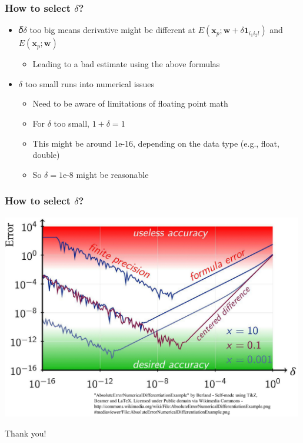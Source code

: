 \documentclass[12pt,notes,mathserif]{beamer}
\newcommand{\chuhao}{\fontsize{44.9pt}{\baselineskip}\selectfont}
\begin{document}
\begin{frame}[c]
\frametitle{How to select $\delta$?}
\begin{itemize}
\item 𝛿$\delta$ too big means derivative might be different at $E(\mathbf{x}_p;\mathbf{w}+\delta \mathbf{1}_{i_1i_2l})$ and $E(\mathbf{x}_p;\mathbf{w})$
		\begin{itemize}
		\item Leading to a bad estimate using the above formulas
		\end{itemize}
\item $\delta$ too small runs into numerical issues
		\begin{itemize}
		\item Need to be aware of limitations of floating point math
		\item For $\delta$ too small, $1+\delta =1$
		\item This might be around 1e-16, depending on the data type (e.g., float, double)
		\item So $\delta= 1$e-8 might be reasonable
		\end{itemize}
\end{itemize}
\end{frame}

\begin{frame}[c]
\frametitle{How to select $\delta$?}
\begin{center}
\includegraphics[width=0.99\textwidth]{fig/lec617.jpg}
\end{center}
\end{frame}









\begin{frame}
\begin{center}
\chuhao Thank you! %
\end{center}
\end{frame}
\end{document}
